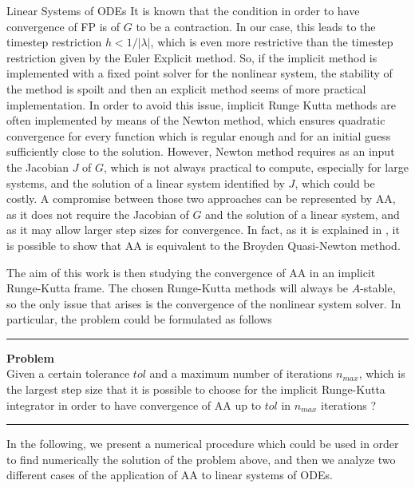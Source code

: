 \documentclass{article}
\begin{document}
\begin{section}{Linear Systems of ODEs}
\noindent It is known that the condition in order to have convergence of FP is of $G$ to be a contraction. In our case, this leads to the timestep restriction $ h < 1/|\lambda|$, which is even more restrictive than the timestep restriction given by the Euler Explicit method. So, if the implicit method is implemented with a fixed point solver for the nonlinear system, the stability of the method is spoilt and then an explicit method seems of more practical implementation. In order to avoid this issue, implicit Runge Kutta methods are often implemented by means of the Newton method, which ensures quadratic convergence for every function which is regular enough and for an initial guess sufficiently close to the solution. However, Newton method requires as an input the Jacobian $J$ of $G$, which is not always practical to compute, especially for large systems, and the solution of a linear system identified by $J$, which could be costly. A compromise between those two approaches can be represented by AA, as it does not require the Jacobian of $G$ and the solution of a linear system, and as it may allow larger step sizes for convergence. In fact, as it is explained in \cite{SAAD}, it is possible to show that AA is equivalent to the Broyden Quasi-Newton method. \par
The aim of this work is then studying the convergence of AA in an implicit Runge-Kutta frame. The chosen Runge-Kutta methods will always be $A$-stable, so the only issue that arises is the convergence of the nonlinear system solver. In particular, the problem could be formulated as follows 

\noindent\rule{8cm}{0.6 pt}

\textbf{Problem} \\
Given a certain tolerance $tol$ and a maximum number of iterations $n_{max}$, which is the largest step size that it is possible to choose for the implicit Runge-Kutta integrator in order to have convergence of AA up to $tol$ in $n_{max}$ iterations ?

\noindent\rule{8cm}{0.6 pt}

In the following, we present a numerical procedure which could be used in order to find numerically the solution of the problem above, and then we analyze two different cases of the application of AA to linear systems of ODEs.


\end{section}
\end{document}
